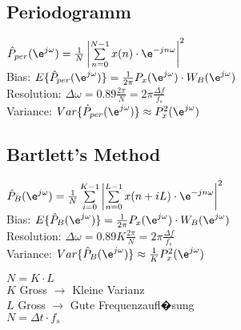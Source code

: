 
\vspace{0.2cm}

\begin{minipage}{7cm}
\subsection{Periodogramm}
$\hat{P}_{per}(\e^{j\omega})=\frac 1N \left|\sum\limits_{n=0}^{N-1}{x(n)\cdot\e^{-j n \omega}}\right|^2$\\
Bias: $E\{\hat{P}_{per}(\e^{j\omega})\}=\frac 1{2\pi} P_x(\e^{j\omega})\cdot W_B(\e^{j\omega})$\\
Resolution: $\Delta\omega=0.89\frac{2\pi}N=2\pi\frac{\Delta f}{f_s}$\\
Variance: $Var\{\hat{P}_{per}(\e^{j\omega})\}\approx P_x^2(\e^{j\omega})$
\end{minipage}
\begin{minipage}{12cm}
	\begin{minipage}{7cm}
		\subsection{Bartlett's Method}
		$\hat{P}_{B}(\e^{j\omega})=\frac 1N \sum\limits_{i=0}^{K-1}{\left|\sum\limits_{n=0}^{L-1}{x(n+i L)\cdot\e^{-j n \omega}}\right|^2}$\\
		Bias: $E\{\hat{P}_{B}(\e^{j\omega})\}=\frac 1{2\pi} P_x(\e^{j\omega})\cdot W_B(\e^{j\omega})$\\
		Resolution: $\Delta\omega=0.89K\frac{2\pi}N=2\pi\frac{\Delta f}{f_s}$\\
		Variance: $Var\{\hat{P}_{B}(\e^{j\omega})\}\approx \frac 1K P_x^2(\e^{j\omega})$
	\end{minipage}
	\begin{minipage}{4.8cm}
		$N=K\cdot L$\\
		$K$ Gross $\rightarrow$ Kleine Varianz\\
		$L$ Gross $\rightarrow$ Gute Frequenzaufl�sung\\
		$N=\Delta t\cdot f_s$
	\end{minipage}
\end{minipage}